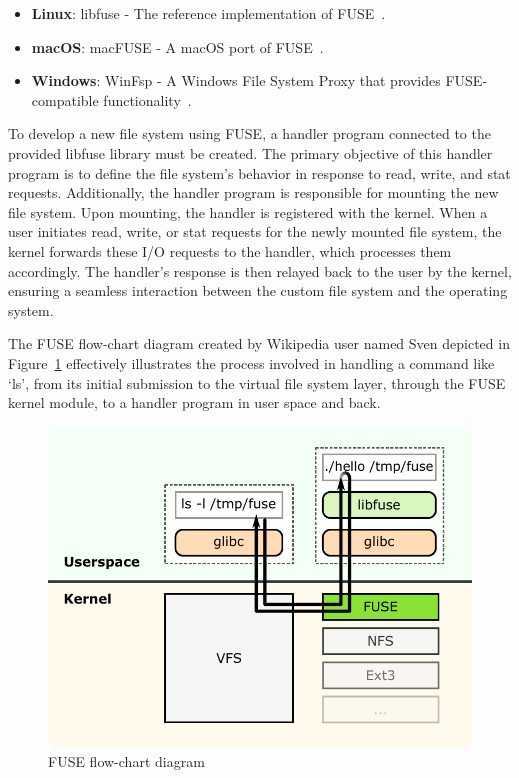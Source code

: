 \begin{itemize}
    \item \textbf{Linux}: libfuse - The reference implementation of FUSE~\cite{libfuse}.
    \item \textbf{macOS}: macFUSE - A macOS port of FUSE~\cite{osxfuse}.
    \item \textbf{Windows}: WinFsp - A Windows File System Proxy that provides FUSE-compatible functionality~\cite{winfsp}.
\end{itemize}

To develop a new file system using FUSE, a handler program connected to the provided libfuse library must be created.
The primary objective of this handler program is to define the file system's behavior in response to read, write, and stat requests.
Additionally, the handler program is responsible for mounting the new file system.
Upon mounting, the handler is registered with the kernel.
When a user initiates read, write, or stat requests for the newly mounted file system, the kernel forwards these I/O requests to the handler, which processes them accordingly.
The handler's response is then relayed back to the user by the kernel, ensuring a seamless interaction between the custom file system and the operating system.

The FUSE flow-chart diagram created by Wikipedia user named Sven\cite{fuse-diagram} depicted in Figure~\ref{fig:fuse-diagram} effectively illustrates the process involved in handling a command like `ls', from its initial submission to the virtual file system layer, through the FUSE kernel module, to a handler program in user space and back.

\begin{figure}[ht]
    \centering
    \includegraphics[width=0.8\linewidth]{img/fuse_diagram}
    \caption{FUSE flow-chart diagram}\label{fig:fuse-diagram}
\end{figure}

